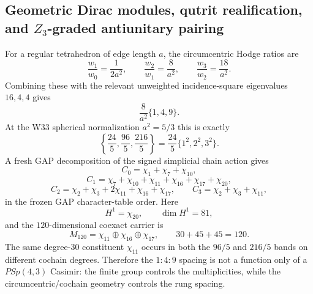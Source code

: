 \subsection*{Geometric Dirac modules, qutrit realification, and $Z_3$-graded antiunitary pairing}

For a regular tetrahedron of edge length $a$, the circumcentric Hodge ratios are
\[
\frac{w_1}{w_0}=\frac{1}{2a^2},\qquad
\frac{w_2}{w_1}=\frac{8}{a^2},\qquad
\frac{w_3}{w_2}=\frac{18}{a^2}.
\]
Combining these with the relevant unweighted incidence-square eigenvalues
$16,4,4$ gives
\[
\boxed{
\frac{8}{a^2}\{1,4,9\}.
}
\]
At the W33 spherical normalization $a^2=5/3$ this is exactly
\[
\boxed{
\left\{\frac{24}{5},\frac{96}{5},\frac{216}{5}\right\}
=
\frac{24}{5}\{1^2,2^2,3^2\}.
}
\]
A fresh GAP decomposition of the signed simplicial chain action gives
\[
C_0=\chi_1+\chi_7+\chi_{10},
\]
\[
C_1=\chi_7+\chi_{10}+\chi_{11}+\chi_{16}+\chi_{17}+\chi_{20},
\]
\[
C_2=\chi_2+\chi_3+2\chi_{11}+\chi_{16}+\chi_{17},
\qquad
C_3=\chi_2+\chi_3+\chi_{11},
\]
in the frozen GAP character-table order.  Here
\[
\boxed{H^1=\chi_{20},\qquad \dim H^1=81,}
\]
and the $120$-dimensional coexact carrier is
\[
\boxed{
M_{120}=\chi_{11}\oplus\chi_{16}\oplus\chi_{17},
\qquad
30+45+45=120.
}
\]
The same degree-$30$ constituent $\chi_{11}$ occurs in both the $96/5$ and
$216/5$ bands on different cochain degrees.  Therefore the $1:4:9$ spacing is
not a function only of a $PSp(4,3)$ Casimir: the finite group controls the
multiplicities, while the circumcentric/cochain geometry controls the rung
spacing.

